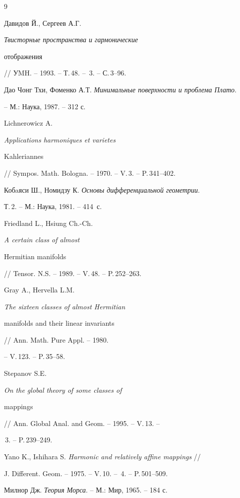 \begin{thebibliography}{9}







Давидов Й., Сергеев А.Г. {\it Твисторные пространства и гармонические


отображения} // УMH. -- 1993. -- Т.\,48. -- \No\,3. -- С.\,3--96.




Дао Чонг Тхи, Фоменко А.Т. {\it Минимальные поверхности и проблема Плато}.


-- М.: Наука, 1987. -- 312 с.




Lichnerowicz A. {\it Applications harmoniques et varietes


Kahleriannes} // Sympos. Math. Bologna. -- 1970. -- V.\,3. -- P.\,341--402.




Кобaяси Ш., Номидзу К. {\it Основы дифференциальной геометрии}.


Т.\,2. -- М.: Наука, 1981. -- 414~с.




Friedland L., Hsiung Ch.-Ch. {\it A certain class of almost


Hermitian manifolds} // Tensor. N.S. -- 1989. -- V.\,48. -- P.\,252--263.




Gray A., Hervella L.M. {\em The sixteen classes of almost Hermitian


manifolds and their linear invariants} // Ann. Math. Pure Appl. -- 1980.


-- V.\,123. -- P.\,35--58.




Stepanov S.E. {\it On the global theory of some classes of


mappings} // Ann. Global Anal. and Geom. -- 1995. -- V.\,13. --


\No\,3. -- P.\,239--249.




Yano K., Ishihara S. {\it Harmonic and relatively affine mappings} //


J. Different. Geom. -- 1975. -- V.\,10. -- \No\,4. -- P.\,501--509.




Милнор Дж. {\it Теория Морса}. -- М.: Мир, 1965. -- 184 с.





\end{thebibliography}





\vskip 2cm












\label{end}











